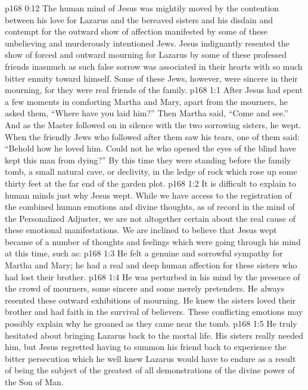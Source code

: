 \vs p168 0:12 The human mind of Jesus was mightily moved by the contention between his love for Lazarus and the bereaved sisters and his disdain and contempt for the outward show of affection manifested by some of these unbelieving and murderously intentioned Jews. Jesus indignantly resented the show of forced and outward mourning for Lazarus by some of these professed friends inasmuch as such false sorrow was associated in their hearts with so much bitter enmity toward himself. Some of these Jews, however, were sincere in their mourning, for they were real friends of the family.\plusone
{}
\vs p168 1:1 After Jesus had spent a few moments in comforting Martha and Mary, apart from the mourners, he asked them, \textcolor{ubdarkred}{“Where have you laid him?”} Then Martha said, “Come and see.” And as the Master followed on in silence with the two sorrowing sisters, he wept. When the friendly Jews who followed after them saw his tears, one of them said: “Behold how he loved him. Could not he who opened the eyes of the blind have kept this man from dying?” By this time they were standing before the family tomb, a small natural cave, or declivity, in the ledge of rock which rose up some thirty feet at the far end of the garden plot.
\pc \vs p168 1:2 It is difficult to explain to human minds just why Jesus wept. While we have access to the registration of the combined human emotions and divine thoughts, as of record in the mind of the Personalized Adjuster, we are not altogether certain about the real cause of these emotional manifestations. We are inclined to believe that Jesus wept because of a number of thoughts and feelings which were going through his mind at this time, such as:\plusone
\pc \vs p168 1:3 \bibnobreakspace He felt a genuine and sorrowful sympathy for Martha and Mary; he had a real and deep human affection for these sisters who had lost their brother.
\pc \vs p168 1:4 \bibnobreakspace He was perturbed in his mind by the presence of the crowd of mourners, some sincere and some merely pretenders. He always resented these outward exhibitions of mourning. He knew the sisters loved their brother and had faith in the survival of believers. These conflicting emotions may possibly explain why he groaned as they came near the tomb.
\pc \vs p168 1:5 \bibnobreakspace He truly hesitated about bringing Lazarus back to the mortal life. His sisters really needed him, but Jesus regretted having to summon his friend back to experience the bitter persecution which he well knew Lazarus would have to endure as a result of being the subject of the greatest of all demonstrations of the divine power of the Son of Man.
